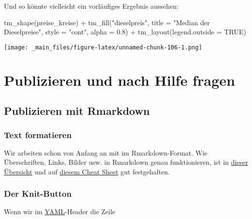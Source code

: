 \documentclass[11pt,german,a4paper]{article}
\newenvironment{Shaded}{\begin{snugshade}}{\end{snugshade}}
\newcommand{\AttributeTok}[1]{\textcolor[rgb]{0.77,0.63,0.00}{#1}}
\newcommand{\ConstantTok}[1]{\textcolor[rgb]{0.00,0.00,0.00}{#1}}
\newcommand{\FloatTok}[1]{\textcolor[rgb]{0.00,0.00,0.81}{#1}}
\newcommand{\FunctionTok}[1]{\textcolor[rgb]{0.00,0.00,0.00}{#1}}
\newcommand{\NormalTok}[1]{#1}
\newcommand{\SpecialCharTok}[1]{\textcolor[rgb]{0.00,0.00,0.00}{#1}}
\newcommand{\StringTok}[1]{\textcolor[rgb]{0.31,0.60,0.02}{#1}}
\begin{document}
Und so könnte vielleicht ein vorläufiges Ergebnis aussehen:

\begin{Shaded}
\begin{Highlighting}[]
\FunctionTok{tm\_shape}\NormalTok{(preise\_kreise) }\SpecialCharTok{+}
  \FunctionTok{tm\_fill}\NormalTok{(}\StringTok{"dieselpreis"}\NormalTok{,}
          \AttributeTok{title =} \StringTok{"Median der Dieselpreise"}\NormalTok{,}
          \AttributeTok{style =} \StringTok{"cont"}\NormalTok{,}
          \AttributeTok{alpha =} \FloatTok{0.8}\NormalTok{) }\SpecialCharTok{+}
  \FunctionTok{tm\_layout}\NormalTok{(}\AttributeTok{legend.outside =} \ConstantTok{TRUE}\NormalTok{)}
\end{Highlighting}
\end{Shaded}

\texttt{[image: \_main\_files/figure-latex/unnamed-chunk-106-1.png]}

\hypertarget{publizieren-und-nach-hilfe-fragen}{%
\section{Publizieren und nach Hilfe fragen}\label{publizieren-und-nach-hilfe-fragen}}

\hypertarget{publizieren-mit-rmarkdown}{%
\subsection{Publizieren mit Rmarkdown}\label{publizieren-mit-rmarkdown}}

\hypertarget{text-formatieren}{%
\subsubsection{Text formatieren}\label{text-formatieren}}

Wir arbeiten schon von Anfang an mit im Rmarkdown-Format. Wie Überschriften, Links, Bilder usw. in Rmarkdown genau funktionieren, ist in \href{https://rmarkdown.rstudio.com/authoring_basics.html}{dieser Übersicht} und auf \href{https://github.com/rstudio/cheatsheets/blob/master/rmarkdown-2.0.pdf}{diesem Cheat Sheet} gut festgehalten.

\hypertarget{der-knit-button}{%
\subsubsection{Der Knit-Button}\label{der-knit-button}}

Wenn wir im \href{https://de.wikipedia.org/wiki/YAML}{YAML}-Header die Zeile
\end{document}
